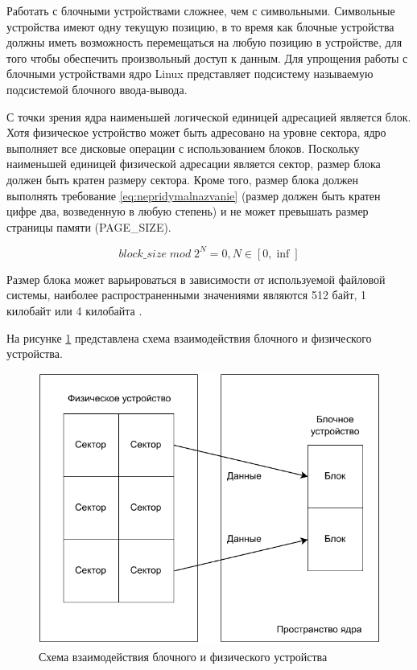 Работать с блочными устройствами сложнее, чем с символьными. Символьные устройства имеют одну текущую позицию, в то время как блочные устройства должны иметь возможность перемещаться на любую позицию в устройстве, для того чтобы обеспечить произвольный доступ к данным. Для упрощения работы с блочными устройствами ядро Linux представляет подсистему называемую подсистемой блочного ввода-вывода.

С точки зрения ядра наименьшей логической единицей адресацией является блок. Хотя физическое устройство может быть адресовано на уровне сектора, ядро выполняет все дисковые операции с использованием блоков. Поскольку наименьшей единицей физической адресации является сектор, размер блока должен быть кратен размеру сектора. Кроме того, размер блока должен выполнять требование \ref{eq:nepridymalnazvanie} (размер должен быть кратен цифре два, возведенную в любую степень) и не может превышать размер страницы памяти (PAGE\_SIZE). 

\begin{equation}\label{eq:nepridymalnazvanie}
	block\_size \; mod \; 2^N = 0, N \in [0, \inf]
\end{equation}

Размер блока может варьироваться в зависимости от используемой файловой системы, наиболее распространенными значениями являются 512 байт, 1 килобайт или 4 килобайта \cite{block-devices}.

На рисунке \ref{fig:block-devices} представлена схема взаимодействия блочного и физического устройства.

\begin{figure}[h]
	\centering
	\includegraphics[width=\textwidth]{img/block-devices.pdf}
	\caption{Схема взаимодействия блочного и физического устройства}
	\label{fig:block-devices}
\end{figure}

